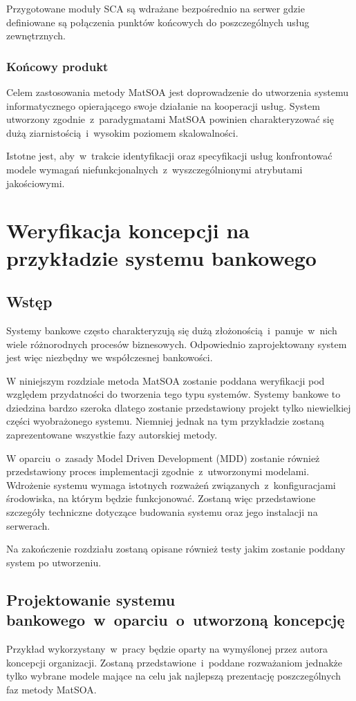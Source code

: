 Przygotowane moduły SCA są wdrażane bezpośrednio na serwer gdzie definiowane są połączenia punktów końcowych do poszczególnych usług zewnętrznych.

\subsection{Końcowy produkt}
Celem zastosowania metody MatSOA jest doprowadzenie do utworzenia systemu informatycznego opierającego swoje działanie na kooperacji usług. System utworzony zgodnie~z~paradygmatami MatSOA powinien charakteryzować się dużą ziarnistością~i~wysokim poziomem skalowalności.

Istotne jest, aby~w~trakcie identyfikacji oraz specyfikacji usług konfrontować modele wymagań niefunkcjonalnych~z~wyszczególnionymi atrybutami jakościowymi.

\chapter{Weryfikacja koncepcji na przykładzie systemu bankowego}
\section{Wstęp}
Systemy bankowe często charakteryzują się dużą złożonością~i~panuje~w~nich wiele różnorodnych procesów biznesowych. Odpowiednio zaprojektowany system jest więc niezbędny we współczesnej bankowości.
 
W niniejszym rozdziale metoda MatSOA zostanie poddana weryfikacji pod względem przydatności do tworzenia tego typu systemów. Systemy bankowe to dziedzina bardzo szeroka dlatego zostanie przedstawiony projekt tylko niewielkiej części wyobrażonego systemu. Niemniej jednak na tym przykładzie zostaną zaprezentowane wszystkie fazy autorskiej metody.

W oparciu~o~zasady Model Driven Development (MDD) zostanie również przedstawiony proces implementacji zgodnie~z~utworzonymi modelami. Wdrożenie systemu wymaga istotnych rozważeń związanych~z~konfiguracjami środowiska, na którym będzie funkcjonować. Zostaną więc przedstawione szczegóły techniczne dotyczące budowania systemu oraz jego instalacji na serwerach.

Na zakończenie rozdziału zostaną opisane również testy jakim zostanie poddany system po utworzeniu.

\section{Projektowanie systemu bankowego~w~oparciu~o~utworzoną koncepcję}
Przykład wykorzystany~w~pracy będzie oparty na wymyślonej przez autora koncepcji organizacji. Zostaną przedstawione~i~poddane rozważaniom jednakże tylko wybrane modele mające na celu jak najlepszą prezentację poszczególnych faz metody MatSOA.

